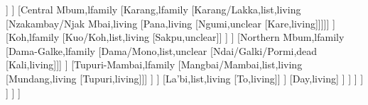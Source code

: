 \documentclass[landscape]{standalone}
\begin{document}
\begin{forest}
									[Mbum/Gbete,list,living
									[Mbere,living]]
								]
								[Central Mbum,lfamily
									[Karang,lfamily
										[Karang/Lakka,list,living
										[Nzakambay/Njak Mbai,living
										[Pana,living
										[Ngumi,unclear
										[Kare,living]]]]]
									]
									[Koh,lfamily
										[Kuo/Koh,list,living
										[Sakpu,unclear]]
									]
								]
								[Northern Mbum,lfamily
									[Dama-Galke,lfamily
										[Dama/Mono,list,unclear
										[Ndai/Galki/Pormi,dead
										[Kali,living]]]
									]
									[Tupuri-Mambai,lfamily
										[Mangbai/Mambai,list,living
										[Mundang,living
										[Tupuri,living]]]
									]
								]
								[La'bi,list,living
								[To,living]]
							]
							[Day,living]
						]
					]
				]
			]
		]
	]
]
\end{forest}
\end{document}
